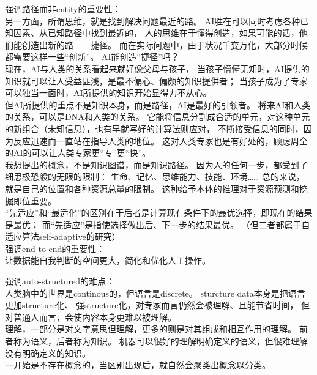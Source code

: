 \documentclass[12pt]{ctexart}
\theoremstyle{definition}
\begin{document}
强调路径而非entity的重要性：\\
另一方面，所谓思维，就是找到解决问题最近的路。
AI胜在可以同时考虑各种已知因素、从已知路径中找到最近的，
人的思维在于懂得创造，如果可能的话，他们能创造出新的路——捷径。
而在实际问题中，由于状况千变万化，大部分时候都需要这样一些“创新”。
AI能创造“捷径”吗？\\
现在，AI与人类的关系看起来就好像父母与孩子，
当孩子懵懂无知时，AI提供的知识就可以让人受益匪浅，是最不偏心、偏颇的知识提供者；
当孩子成为了专家可以独当一面时，AI所提供的知识开始显得力不从心。\\
但AI所提供的重点不是知识本身，而是路径，AI是最好的引领者。
将来AI和人类的关系，可以是DNA和人类的关系。
它能将信息分割成合适的单元，对这种单元的新组合（未知信息），也有早就写好的计算法则应对，
不断接受信息的同时，因为反应迅速而一直站在指导人类的地位。
这对人类专家也是有好处的，顾虑周全的AI的可以让人类专家更“专”更“快”。\\
我想提出的概念，不是知识图谱，而是知识路径。
因为人的任何一步，都受到了细思极恐般的无限的限制：
生命、记忆、思维能力、技能、环境……
总的来说，就是自己的位置和各种资源总量的限制。
这种给予本体的推理对于资源预测和挖掘即位重要。\\
“先适应”和“最适化”的区别在于后者是计算现有条件下的最优选择，即现在的结果是最优；
而“先适应”是指使选择做出后、下一步的结果最优。
（但二者都属于自适应算法self-adaptive的研究）\\

强调end-to-end的重要性：\\
让数据能自我判断的空间更大，简化和优化人工操作。

强调auto-structured的难点：\\
人类脑中的世界是continous的，但语言是discrete。
sturcture data本身是把语言更加structure化、
强structure化，对专家而言仍然会被理解、且能节省时间，
但对普通人而言，会使内容本身更难以被理解。\\
理解，一部分是对文字意思但理解，更多的则是对其组成和相互作用的理解。
前者称为语义，后者称为知识。
机器可以很好的理解明确定义的语义，但很难理解没有明确定义的知识。\\
一开始是不存在概念的，当区别出现后，就自然会聚类出概念以分类。
\end{document}
